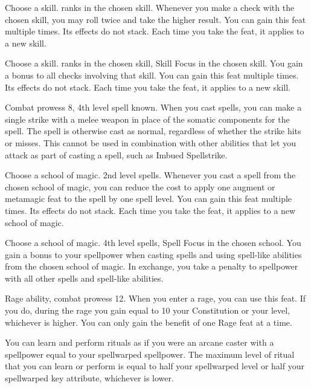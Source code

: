 Choose a skill.
 ranks in the chosen skill.
\featben Whenever you make a check with the chosen skill, you may roll twice and take the higher result.
You can gain this feat multiple times.
Its effects do not stack.
Each time you take the feat, it applies to a new skill.

Choose a skill.
 ranks in the chosen skill, Skill Focus in the chosen skill.
\featben You gain a  bonus to all checks involving that skill.
You can gain this feat multiple times.
Its effects do not stack.
Each time you take the feat, it applies to a new skill.

\featpres Combat prowess 8, 4th level spell known.
\featben When you cast spells, you can make a single strike with a melee weapon in place of the somatic components for the spell.
The spell is otherwise cast as normal, regardless of whether the strike hits or misses.
This cannot be used in combination with other abilities that let you attack as part of casting a spell, such as Imbued Spellstrike.

Choose a school of magic.
\featpre 2nd level spells.
\featben Whenever you cast a spell from the chosen school of magic, you can reduce the cost to apply one augment or metamagic feat to the spell by one spell level.
You can gain this feat multiple times.
Its effects do not stack.
Each time you take the feat, it applies to a new school of magic.

Choose a school of magic.
\featpres 4th level spells, Spell Focus in the chosen school.
\featben You gain a  bonus to your spellpower when casting spells and using spell-like abilities from the chosen school of magic.
In exchange, you take a  penalty to spellpower with all other spells and spell-like abilities.

\featpres Rage ability, combat prowess 12.
\featben When you enter a rage, you can use this feat. If you do, during the rage you gain  equal to 10 \add your Constitution or your level, whichever is higher.
 You can only gain the benefit of one Rage feat at a time.

\featben You can learn and perform rituals as if you were an arcane caster with a spellpower equal to your spellwarped spellpower.
The maximum level of ritual that you can learn or perform is equal to half your spellwarped level or half your spellwarped key attribute, whichever is lower.

